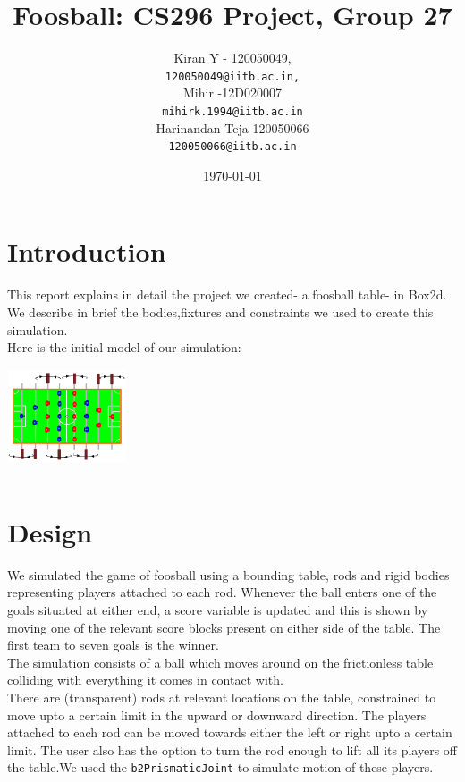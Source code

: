 \documentclass{article}
\begin{document}
\title{Foosball: CS296 Project, Group 27}

\author{
Kiran Y - 120050049,\\
\texttt{120050049@iitb.ac.in,}\\
Mihir -12D020007\\
\texttt{mihirk.1994@iitb.ac.in}\\
Harinandan Teja-120050066\\
\texttt{120050066@iitb.ac.in}\\
}
\date{\today}

\maketitle

\section{Introduction}
This report explains in detail the project we created- a foosball table- in Box2d. We describe in brief the bodies,fixtures and constraints we used to create this simulation.\\
Here is the initial model of our simulation:\\
\includegraphics[width=100pt,height=100pt]{foosball}

\section{Design}
We simulated the game of foosball using a bounding table, rods and rigid bodies representing players attached to each rod. Whenever the ball enters one of the goals situated at either end, a score variable is updated and this is shown by moving one of the relevant score blocks present on either side of the table. The first team to seven goals is the winner.\\

The simulation consists of a ball which moves around on the frictionless table colliding with everything it comes in contact with.\\

There are (transparent) rods at relevant locations on the table, constrained to move upto a certain limit in the upward or downward direction. The players attached to each rod can be moved towards either the left or right upto a certain limit. The user also has the option to turn the rod enough to lift all its players off the table.We used the \texttt{b2PrismaticJoint} to simulate motion of these players.\\
\end{document}
